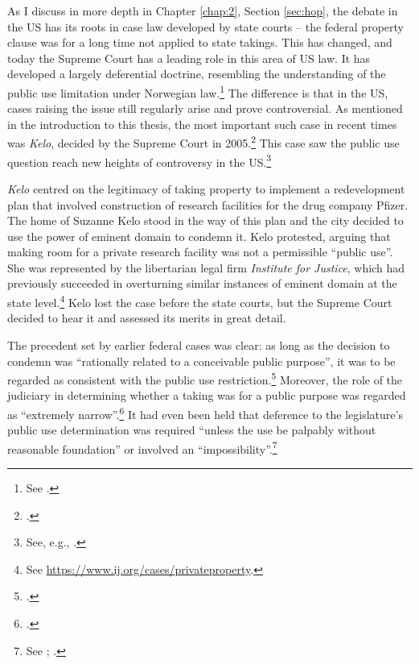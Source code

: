 As I discuss in more depth in Chapter \ref{chap:2}, Section \ref{sec:hop}, the debate in the US has its roots in case law developed by state courts -- the federal property clause was for a long time not applied to state takings. This has changed, and today the Supreme Court has a leading role in this area of US law. It has developed a largely deferential doctrine, resembling the understanding of the public use limitation under Norwegian law.\footnote{See \cite{berman54,midkiff84,kelo05}.} The difference is that in the US, cases raising the issue still regularly arise and prove controversial. As mentioned in the introduction to this thesis, the most important such case in recent times was {\it Kelo}, decided by the Supreme Court in 2005.\footcite{kelo05} This case saw the public use question reach new heights of controversy in the US.\footnote{See, e.g., \cite{somin09}.}

{\it Kelo} centred on the legitimacy of taking property to implement a redevelopment plan that involved construction of research facilities for the drug company Pfizer. The home of Suzanne Kelo stood in the way of this plan and the city decided to use the power of eminent domain to condemn it. Kelo protested, arguing that making room for a private research facility was not a permissible ``public use''. She was represented by the libertarian legal firm {\it Institute for Justice}, which had previously succeeded in overturning similar instances of eminent domain at the state level.\footnote{See \url{https://www.ij.org/cases/privateproperty}.} Kelo lost the case before the state courts, but the Supreme Court decided to hear it and assessed its merits in great detail.

The precedent set by earlier federal cases was clear: as long as the decision to condemn was ``rationally related to a conceivable public purpose'', it was to be regarded as consistent with the public use restriction.\footcite[241]{midkiff84} Moreover, the role of the judiciary in determining whether a taking was for a public purpose was regarded as ``extremely narrow''.\footcite[32]{berman54} It had even been held that deference to the legislature's public use determination was required ``unless the use be palpably without reasonable foundation'' or involved an ``impossibility''.\footnote{See \cite[66]{dominion25}; \cite[680]{gettysburg96}.}


